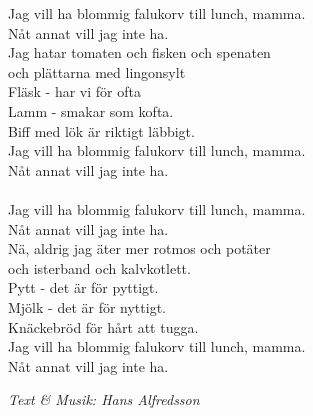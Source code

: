 \vspace{10pt}
Jag vill ha blommig falukorv till lunch, mamma.\\
Nåt annat vill jag inte ha.\\
Jag hatar tomaten och fisken och spenaten\\
och plättarna med lingonsylt\\
Fläsk - har vi för ofta\\
Lamm - smakar som kofta.\\
Biff med lök är riktigt läbbigt.\\
Jag vill ha blommig falukorv till lunch, mamma.\\
Nåt annat vill jag inte ha.\\
\\
Jag vill ha blommig falukorv till lunch, mamma.\\
Nåt annat vill jag inte ha.\\
Nä, aldrig jag äter mer rotmos och potäter\\
och isterband och kalvkotlett.\\
Pytt - det är för pyttigt.\\
Mjölk - det är för nyttigt.\\
Knäckebröd för hårt att tugga.\\
Jag vill ha blommig falukorv till lunch, mamma.\\
Nåt annat vill jag inte ha.
\par
\vspace{10pt}
{\footnotesize\textit{Text \& Musik: Hans Alfredsson}}
